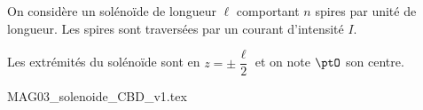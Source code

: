 
\finEntrainement




\newpage



\hauteurLargeurCadreReponse		{8mm}{2cm}
\initialisationEntrainement


                                \initialisationPartieGauche %
On considère un solénoïde de longueur $\ell$ comportant $n$ spires par unité de longueur. Les spires sont traversées par un courant d'intensité $I$. 

Les extrémités du solénoïde sont en $z=\pm\dfrac{\ell}{2}$ et on note $\ptO$ son centre.


                                \initialisationPartieDroite %
% 
\begin{center}
{MAG03_solenoide_CBD_v1.tex}
\end{center}                                                          
%
% 
                               \finalisationDuPartageDePage %

